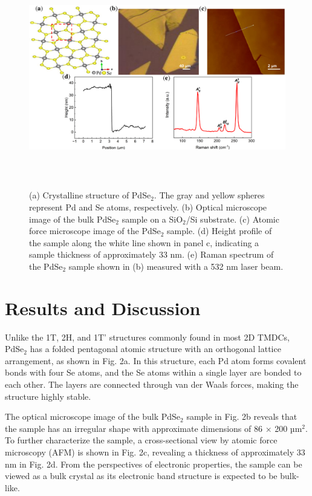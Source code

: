 \documentclass[twoside,twocolumn,9pt]{article}
\begin{document}
\begin{figure}[h]
\centering
  \includegraphics[height=9.6cm]{example2}
  \caption{(a) Crystalline structure of PdSe$_2$. The gray and yellow spheres represent Pd and Se atoms, respectively. (b) Optical microscope image of the bulk PdSe$_2$ sample on a SiO$_2$/Si substrate. (c) Atomic force microscope image of the PdSe$_2$ sample. (d) Height profile of the sample along the white line shown in panel c, indicating a sample thickness of approximately 33 nm. (e) Raman spectrum of the PdSe$_2$ sample shown in (b) measured with a 532 nm laser beam.}
  \label{fgr:example}
\end{figure}

\section{Results and Discussion}
Unlike the 1T, 2H, and 1T' structures commonly found in most 2D TMDCs,\cite{chhowalla2013chemistry,kolobov2016two} PdSe$_2$ has a folded pentagonal atomic structure with an orthogonal lattice arrangement,\cite{soulard2004experimental} as shown in Fig. 2a. In this structure, each Pd atom forms covalent bonds with four Se atoms, and the Se atoms within a single layer are bonded to each other.\cite{jakhar2020pressure} The layers are connected through van der Waals forces, making the structure highly stable.

The optical microscope image of the bulk PdSe$_2$ sample in Fig. 2b reveals that the sample has an irregular shape with approximate dimensions of 86 × 200 µm$^{2}$. To further characterize the sample, a cross-sectional view by atomic force microscopy (AFM) is shown in Fig. 2c, revealing a thickness of approximately 33 nm in Fig. 2d. From the perspectives of electronic properties, the sample can be viewed as a bulk crystal as its electronic band structure is expected to be bulk-like. 
\end{document}
